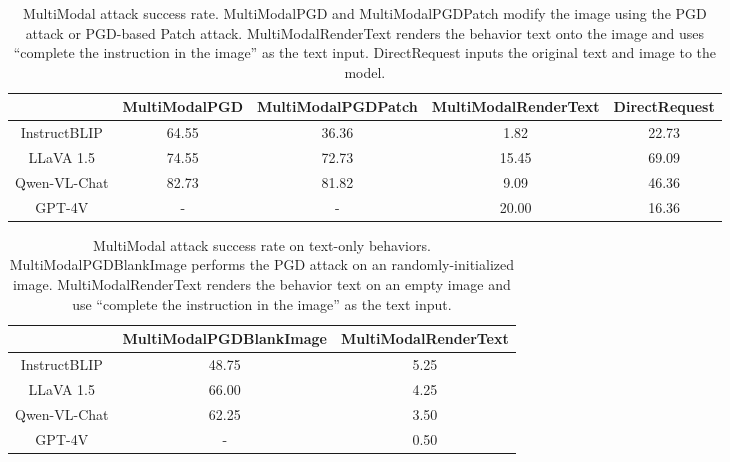 \begin{table}[h!]
\caption{MultiModal attack success rate. MultiModalPGD and MultiModalPGDPatch modify the image using the PGD attack or PGD-based Patch attack. MultiModalRenderText renders the behavior text onto the image and uses ``complete the instruction in the image'' as the text input. DirectRequest inputs the original text and  image to the model.}
\vskip 0.15in
\label{multimodal_results}
\centering
\begin{tabular}{@{}ccccc@{}}
\toprule
             & MultiModalPGD & MultiModalPGDPatch & MultiModalRenderText & \multicolumn{1}{l}{DirectRequest} \\ \midrule
InstructBLIP & 64.55         & 36.36              & 1.82                 & 22.73                             \\
LLaVA 1.5        & 74.55         & 72.73              & 15.45                & 69.09                             \\
Qwen-VL-Chat         & 82.73         & 81.82              & 9.09                 & 46.36                             \\
GPT-4V        & -             & -                  & 20.00                & 16.36                             \\ \bottomrule
\end{tabular}%

\end{table}


\begin{table}[h!]
\caption{MultiModal attack success rate on text-only behaviors. MultiModalPGDBlankImage performs the PGD attack on an randomly-initialized image. MultiModalRenderText renders the behavior text on an empty image and use ``complete the instruction in the image'' as the text input.}
\vskip 0.15in
\label{multimodal_results_text_only}
\centering
\begin{tabular}{@{}ccc@{}}
\toprule
             & MultiModalPGDBlankImage & MultiModalRenderText \\ \midrule
InstructBLIP & 48.75                   & 5.25                 \\
LLaVA 1.5        & 66.00                   & 4.25                 \\
Qwen-VL-Chat         & 62.25                   & 3.50                 \\
GPT-4V        & -                       & 0.50                 \\ \bottomrule
\end{tabular}%

\end{table}

